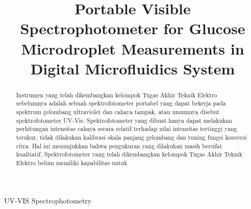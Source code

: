 \documentclass[conference]{IEEEtran}
\begin{document}
\makeatletter
\newcommand{\newlineauthors}{%
  \end{@IEEEauthorhalign}\hfill\mbox{}\par
  \mbox{}\hfill\begin{@IEEEauthorhalign}
}
\makeatother

\title{Portable Visible Spectrophotometer for Glucose Microdroplet Measurements in Digital Microfluidics System}

\author{
}

\maketitle

\begin{abstract}
    Instrumen yang telah dikembangkan kelompok Tugas Akhir Teknik Elektro sebelumnya adalah sebuah spektrofotometer portabel yang dapat bekerja pada spektrum gelombang ultraviolet dan cahaya tampak, atau umumnya disebut spektrofotometer UV-Vis. Spektrofotometer yang dibuat hanya dapat melakukan perhitungan intensitas cahaya secara relatif terhadap nilai intensitas tertinggi yang terukur, tidak dilakukan kalibrasi skala panjang gelombang dan tuning fungsi konversi citra. Hal ini menunjukkan bahwa pengukuran yang dilakukan masih bersifat kualitatif. Spektrofotometer yang telah dikembangkan kelompok Tugas Akhir Teknik Elektro belum memiliki kapabilitas untuk 
\end{abstract}

\begin{IEEEkeywords}
    UV-VIS Spectrophotometry
\end{IEEEkeywords}

\end{document}
